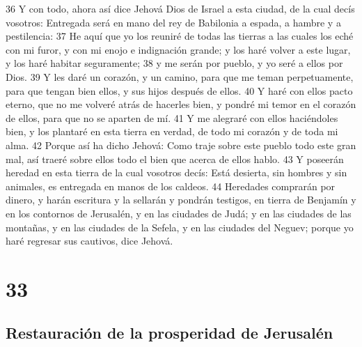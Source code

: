 36 Y con todo, ahora así dice Jehová Dios de Israel a esta ciudad, de la cual decís vosotros: Entregada será en mano del rey de Babilonia a espada, a hambre y a pestilencia:
37 He aquí que yo los reuniré de todas las tierras a las cuales los eché con mi furor, y con mi enojo e indignación grande; y los haré volver a este lugar, y los haré habitar seguramente;
38 y me serán por pueblo, y yo seré a ellos por Dios.
39 Y les daré un corazón, y un camino, para que me teman perpetuamente, para que tengan bien ellos, y sus hijos después de ellos.
40 Y haré con ellos pacto eterno, que no me volveré atrás de hacerles bien, y pondré mi temor en el corazón de ellos, para que no se aparten de mí.
41 Y me alegraré con ellos haciéndoles bien, y los plantaré en esta tierra en verdad, de todo mi corazón y de toda mi alma.
42 Porque así ha dicho Jehová: Como traje sobre este pueblo todo este gran mal, así traeré sobre ellos todo el bien que acerca de ellos hablo.
43 Y poseerán heredad en esta tierra de la cual vosotros decís: Está desierta, sin hombres y sin animales, es entregada en manos de los caldeos.
44 Heredades comprarán por dinero, y harán escritura y la sellarán y pondrán testigos, en tierra de Benjamín y en los contornos de Jerusalén, y en las ciudades de Judá; y en las ciudades de las montañas, y en las ciudades de la Sefela, y en las ciudades del Neguev; porque yo haré regresar sus cautivos, dice Jehová.

\chapter{33}

\section*{Restauración de la prosperidad de Jerusalén}

